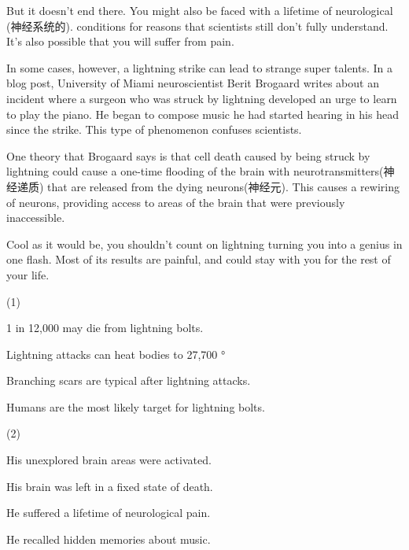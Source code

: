 \documentclass{英语试卷}
\begin{document}
\par But it doesn't end there. You might also be faced with a lifetime of neurological (神经系统的). conditions for reasons that scientists still don't fully understand. It's also possible that you will suffer from pain.\par
\par In some cases, however, a lightning strike can lead to strange super talents. In a blog post, University of Miami neuroscientist Berit Brogaard writes about an incident where a surgeon who was struck by lightning developed an urge to learn to play the piano. He began to compose music he had started hearing in his head since the strike. This type of phenomenon confuses scientists.\par
\par One theory that Brogaard says is that cell death caused by being struck by lightning could cause a one-time flooding of the brain with neurotransmitters(神经递质) that are released from the dying neurons(神经元). This causes a rewiring of neurons, providing access to areas of the brain that were previously inaccessible.\par
\par Cool as it would be, you shouldn't count on lightning turning you into a genius in one flash. Most of its results are painful, and could stay with you for the rest of your life.\par
{}
\begin{choices}(1)
  \item 1 in 12,000 may die from lightning bolts.
  \item Lightning attacks can heat bodies to 27,700 °
  \item 
  \item Branching scars are typical after lightning attacks.
  \item Humans are the most likely target for lightning bolts.
\end{choices}
\begin{choices}(2)
  \item His unexplored brain areas were activated.
  \item His brain was left in a fixed state of death.
  \item He suffered a lifetime of neurological pain.
  \item He recalled hidden memories about music.
\end{choices}
\end{document}
